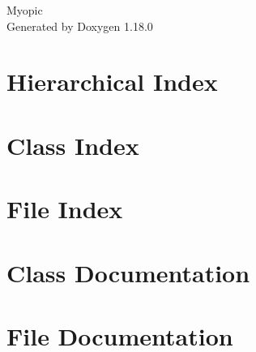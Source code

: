 \documentclass[twoside]{book}
\newcommand{\+}{\discretionary{\mbox{\scriptsize$\hookleftarrow$}}{}{}}
\newcommand{\clearemptydoublepage}{%
    \newpage{\pagestyle{empty}\cleardoublepage}%
  }
\begin{document}
  \raggedbottom
    \hypersetup{pageanchor=false,
                bookmarksnumbered=true,
                pdfencoding=unicode
               }
  \begin{titlepage}
  \vspace*{7cm}
  \begin{center}%
  {\Large Myopic}\\
  \vspace*{1cm}
  {\large Generated by Doxygen 1.18.0}\\
  \end{center}
  \end{titlepage}
  \clearemptydoublepage
  \tableofcontents
  \clearemptydoublepage
  \hypersetup{pageanchor=true}
\chapter{Hierarchical Index}

\chapter{Class Index}

\chapter{File Index}

\chapter{Class Documentation}























\chapter{File Documentation}













  \backmatter
  \newpage
  \clearemptydoublepage
  \printindex
\end{document}
